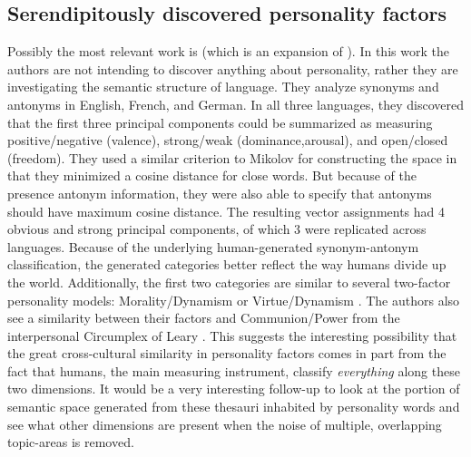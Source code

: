 \documentclass[eric_thesis.tex]{subfiles}
\begin{document}
\subsection{Serendipitously discovered personality factors}

Possibly the most relevant work is  (which is an
expansion of ). In this work the authors are not
intending to discover anything about personality, rather they are investigating 
the semantic structure of language. They
analyze synonyms and antonyms in English, French, and German. In all three
languages, they discovered that the first three principal components could be
summarized as measuring positive/negative (valence), strong/weak 
(dominance,arousal), and open/closed (freedom). They used a similar criterion
to Mikolov for constructing the space in that they minimized a cosine distance
for close words. But because of the presence antonym information, they were
also able to specify that antonyms should have maximum cosine distance.
The resulting vector assignments had 4 obvious and strong principal
components, of which 3 were replicated across languages. Because of the
underlying human-generated synonym-antonym classification, the generated
categories better reflect the way humans divide up the world. Additionally,
the first two categories are similar to several two-factor personality models:
Morality/Dynamism 
or Virtue/Dynamism . The authors also
see a similarity between their factors and Communion/Power from the 
interpersonal Circumplex of Leary . This suggests
the 
interesting possibility that the great cross-cultural similarity in personality
factors comes in part from the fact that humans, the main measuring instrument,
classify \textit{everything} along these two dimensions. It would be a very
interesting follow-up to look at the portion of semantic space generated
from these thesauri inhabited by personality words and see what other 
dimensions are present when the noise of multiple, overlapping topic-areas
is removed.



\end{document}
